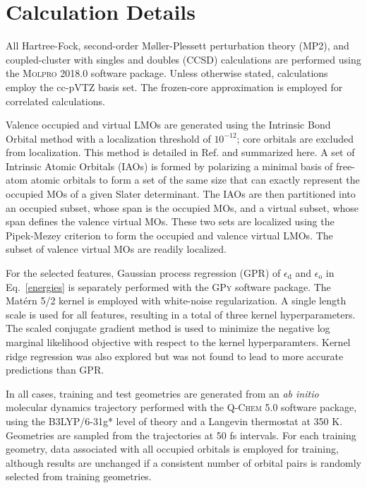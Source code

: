 \documentclass[%
 aps,
 prb,
 twocolumn,
%
 reprint,%
%
citeautoscript,
%
showkeys
]{revtex4-1}
\begin{document}
%

%

%

\section{Calculation %
Details}
\label{sec:calc-details}
All Hartree-Fock, second-order M{\o}ller-Plessett perturbation theory (MP2),\cite{Moller1934} and coupled-cluster with singles and doubles (CCSD)\cite{Cizek1966} calculations are performed using the \textsc{Molpro} 2018.0 software package.\cite{Werner2012} 
Unless otherwise stated, calculations employ the cc-pVTZ basis set.\cite{Dunning1989}
The frozen-core approximation is employed for correlated calculations. 

Valence occupied and virtual LMOs are generated using the Intrinsic Bond Orbital method\cite{Knizia2013IBO} with a localization threshold of $10^{-12}$;  core orbitals are excluded from localization. %
This method is detailed in Ref.  and summarized here. 
A set of Intrinsic Atomic Orbitals (IAOs) is formed by polarizing a minimal basis of free-atom atomic orbitals to form a set of the same size that can exactly represent the occupied MOs of a given Slater determinant. 
The IAOs are then partitioned into an occupied subset, whose span is the occupied MOs, and a virtual subset, whose span defines the valence virtual MOs. 
These two sets are localized using the Pipek-Mezey criterion\cite{Pipek1989} to form the occupied and valence virtual LMOs. The subset of valence virtual MOs are readily localized.\cite{Lu2004,Subotnik2005,Hoyvik2012} 

For the selected features, Gaussian process regression (GPR)\cite{rasmussen2006} of $\epsilon_\textrm{d}$ and $\epsilon_\textrm{o}$ in Eq.~\ref{energies} is separately performed with the \textsc{GPy} software package. \cite{gpy2014}
%
The Mat\'ern 5/2 kernel\cite{rasmussen2006} is employed with white-noise regularization. A single length scale is used for all features, resulting in a total of three kernel hyperparameters. %
The scaled conjugate gradient method\cite{moller1993scaled} is used to minimize the negative log marginal likelihood objective with respect to the kernel hyperparamters. Kernel ridge regression\cite{KRR} was also explored but was not found to lead to more accurate predictions than GPR.

In all cases, training and test geometries are generated from an \textit{ab initio} molecular dynamics trajectory performed with the \textsc{Q-Chem} 5.0 software package,\cite{Shao2015} 
using the B3LYP\cite{Vosko1980,Lee1988,Becke1993,Stephens1994}/6-31g*\cite{Hariharan1973} level of theory and a Langevin thermostat\cite{Bussi2007} at 350 K.
%
Geometries are sampled from the trajectories at 50 fs intervals. 
For each training geometry, data associated with all occupied orbitals is employed for training, although results are unchanged if a consistent number of orbital pairs is randomly selected from training geometries.
%
%
\end{document}
